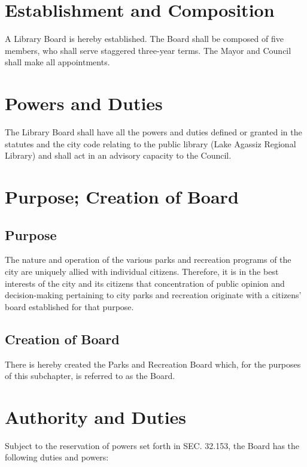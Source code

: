 \setcounter{section}{139}
\section{Establishment and Composition}
A Library Board is hereby established. The Board shall be composed of five members, who shall serve staggered three-year terms. The Mayor and Council shall make all appointments.

\section{Powers and Duties}
The Library Board shall have all the powers and duties defined or granted in the statutes and the city code relating to the public library (Lake Agassiz Regional Library) and shall act in an advisory capacity to the Council.\\

\setcounter{section}{149}
\section{Purpose; Creation of Board}
\subsection{Purpose}
The nature and operation of the various parks and recreation programs of the city are uniquely allied with individual citizens. Therefore, it is in the best interests of the city and its citizens that concentration of public opinion and decision-making pertaining to city parks and recreation originate with a citizens’ board established for that purpose.
\subsection{Creation of Board}
There is hereby created the Parks and Recreation Board which, for the purposes of this subchapter, is referred to as the Board.

\section{Authority and Duties}
Subject to the reservation of powers set forth in SEC. 32.153, the Board has the following duties and powers:
